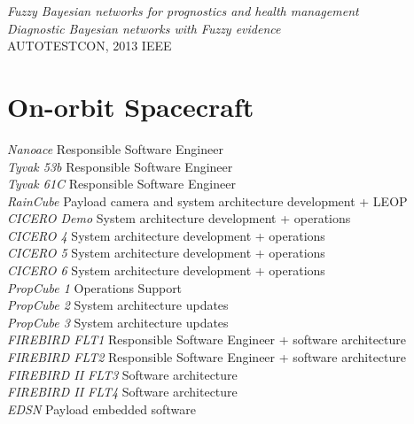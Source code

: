 \documentclass[line,margin]{res}
\begin{document}
\begin{resume}
{\sl Fuzzy Bayesian networks for prognostics and health management}\\

{\sl Diagnostic Bayesian networks with Fuzzy evidence}\\
AUTOTESTCON, 2013 IEEE	

\section{On-orbit Spacecraft}
{\sl Nanoace} \hfill Responsible Software Engineer\\
{\sl Tyvak 53b} \hfill Responsible Software Engineer\\
{\sl Tyvak 61C} \hfill Responsible Software Engineer\\
{\sl RainCube} \hfill Payload camera and system architecture development + LEOP\\
{\sl CICERO Demo} \hfill System architecture development + operations\\
{\sl CICERO 4} \hfill System architecture development + operations\\
{\sl CICERO 5} \hfill System architecture development + operations\\
{\sl CICERO 6} \hfill System architecture development + operations\\
{\sl PropCube 1} \hfill Operations Support\\
{\sl PropCube 2} \hfill System architecture updates\\
{\sl PropCube 3} \hfill System architecture updates\\
{\sl FIREBIRD FLT1} \hfill Responsible Software Engineer + software architecture\\
{\sl FIREBIRD FLT2} \hfill Responsible Software Engineer + software architecture\\
{\sl FIREBIRD II FLT3} \hfill Software architecture\\
{\sl FIREBIRD II FLT4} \hfill Software architecture\\
{\sl EDSN} \hfill Payload embedded software\\
			
\end{resume}
\end{document}
